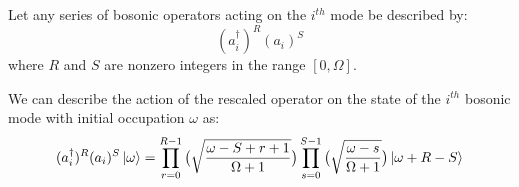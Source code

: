 \begin{tcolorbox}[enhanced,attach boxed title to top center={yshift=-3mm,yshifttext=-1mm}, colback=blue!5!white,colframe=blue!75!black,colbacktitle=orange!80!black, title=Alternative Bosonic Operator Implementation,fonttitle=\bfseries, boxed title style={size=small,colframe=orange!50!black}]

    Let any series of bosonic operators acting on the $i^{th}$ mode be described by:
    \begin{equation}
        (a_i^\dagger)^R (a_i)^S
    \end{equation}
    where $R$ and $S$ are nonzero integers in the range $[0, \Omega]$.

    We can describe the action of the rescaled operator on the state of the $i^{th}$ bosonic mode with initial occupation $\omega$ as:
    \begin{equation}
        \label{eq:bosonic-operator-action}
        (a_i^\dagger)^R (a_i)^S \ket{\omega} = \prod_{r=0}^{R-1} \big( \sqrt{\frac{\omega - S + r + 1}{\Omega + 1}} \big) \prod_{s=0}^{S-1} \big( \sqrt{\frac{\omega - s}{\Omega + 1}} \big) \ket{\omega + R - S}
    \end{equation}


\end{tcolorbox}
